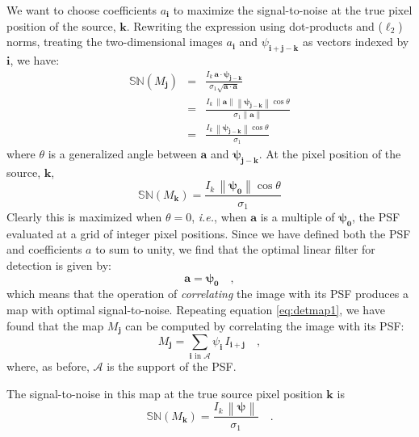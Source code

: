 \documentclass[11pt,letterpaper,linenumbers]{aastex63}
\newcommand{\latin}[1]{\emph{#1}}
\newcommand{\ie}{\latin{i.e.}}
\newcommand{\psf}{\psi}
\newcommand{\psfat}[1]{\psf_{#1}}
\newcommand{\signoise}{[S/N]}
\newcommand{\snr}[1]{\mathbb{SN}(#1)}
\newcommand{\norm}[1]{\left\lVert #1 \right\rVert}
\renewcommand{\vec}[1]{\boldsymbol{#1}}
\newcommand{\avec}{\vec{a}}
\newcommand{\ivec}{\vec{i}}
\newcommand{\jvec}{\vec{j}}
\newcommand{\kvec}{\vec{k}}
\newcommand{\iina}{\ivec \,\, \mathrm{in} \,\, \mathcal{A}}
\begin{document}
We want to choose coefficients $a_{\ivec}$ to maximize the 
signal-to-noise at the true pixel position of the source,
$\kvec$.  Rewriting the expression using dot-products and
($\ell_2$) norms, treating the two-dimensional images
$a_{\ivec}$ and $\psfat{\ivec + \jvec - \kvec}$ as vectors indexed by
$\ivec$, we have:
\begin{eqnarray}
  \snr{M_{\jvec}} &=& \frac{I_k \, \avec \cdot \bm{\psfat{j-k}}}{\sigma_1 \sqrt{\avec \cdot \avec}} \label{eqn:psfdotprod} \\
 &=& \frac{I_k \, \norm{\avec} \norm{\bm{\psfat{j-k}}} \cos \theta}{\sigma_1 \norm{\avec}} \\
 &=& \frac{I_k \, \norm{\bm{\psfat{j-k}}} \cos \theta}{\sigma_1}
\end{eqnarray}
where $\theta$ is a generalized angle between $\avec$ and $\bm{\psfat{j-k}}$.
At the pixel position of the source, $\kvec$,
\begin{equation}
\snr{M_{\kvec}} = \frac{I_k \, \norm{\bm{\psfat{0}}} \cos \theta}{\sigma_1}
\label{eqn:sndsingle}
\end{equation}
Clearly this is maximized when $\theta = 0$, \ie, when $\avec$ is a
multiple of $\bm{\psfat{0}}$, the PSF evaluated at a grid of integer
pixel positions.  Since we have defined both the PSF and coefficients
$a$ to sum to unity, we find that the optimal linear filter for
detection is given by:
\begin{equation}
\avec = \bm{\psfat{0}} \quad ,
\end{equation}
which means that the operation of \emph{correlating} the image with
its PSF produces a map with optimal signal-to-noise.  Repeating
equation \ref{eq:detmap1}, we have found that the map $M_{\jvec}$ can
be computed by correlating the image with its PSF:
\begin{equation}
M_{\jvec} = \sum_{\iina} \psfat{\ivec} \, I_{\ivec + \jvec} \quad ,
\end{equation}
where, as before, $\mathcal{A}$ is the support of the PSF.

The signal-to-noise in this map at the true source pixel
position $\kvec$ is
\begin{equation}
\snr{M_{\kvec}} = \frac{I_k \, \norm{\bm{\psfat{}}}}{\sigma_1} \quad .
\end{equation}
\end{document}
